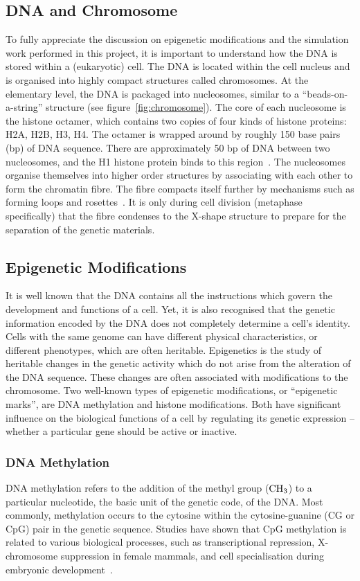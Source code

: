 \documentclass[12pt]{article}
\begin{document}
\subsection{DNA and Chromosome}
To fully appreciate the discussion on epigenetic modifications and the simulation work performed in this project, it is important to understand how the DNA is stored within a (eukaryotic) cell. The DNA is located within the cell nucleus and is organised into highly compact structures called chromosomes. At the elementary level, the DNA is packaged into nucleosomes, similar to a ``beads-on-a-string'' structure (see figure~\ref{fig:chromosome}). The core of each nucleosome is the histone octamer, which contains two copies of four kinds of histone proteins: H2A, H2B, H3, H4. The octamer is wrapped around by roughly 150 base pairs (bp) of DNA sequence. There are approximately 50 bp of DNA between two nucleosomes, and the H1 histone protein binds to this region~\cite{DNABook}. The nucleosomes organise themselves into higher order structures by associating with each other to form the chromatin fibre. The fibre compacts itself further by mechanisms such as forming loops and rosettes~\cite{brackley2016}. It is only during cell division (metaphase specifically) that the fibre condenses to the X-shape structure to prepare for the separation of the genetic materials.  

\subsection{Epigenetic Modifications}
It is well known that the DNA contains all the instructions which govern the development and functions of a cell. Yet, it is also recognised that the genetic information encoded by the DNA does not completely determine a cell's identity. Cells with the same genome can have different physical characteristics, or different phenotypes, which are often heritable. Epigenetics is the study of heritable changes in the genetic activity which do not arise from the alteration of the DNA sequence\cite{DNABook, probst2009}. These changes are often associated with modifications to the chromosome. Two well-known types of epigenetic modifications, or ``epigenetic marks'', are DNA methylation and histone modifications. Both have significant influence on the biological functions of a cell by regulating its genetic expression -- whether a particular gene should be active or inactive. 

\subsubsection{DNA Methylation}
DNA methylation refers to the addition of the methyl group ($\ce{CH3}$) to a particular nucleotide, the basic unit of the genetic code, of the DNA. Most commonly, methylation occurs to the cytosine within the cytosine-guanine (CG or CpG) pair in the genetic sequence. Studies have shown that CpG methylation is related to various biological processes, such as transcriptional repression, X-chromosome suppression in female mammals, and cell specialisation during embryonic development~\cite{DNABook}. 
\end{document}
